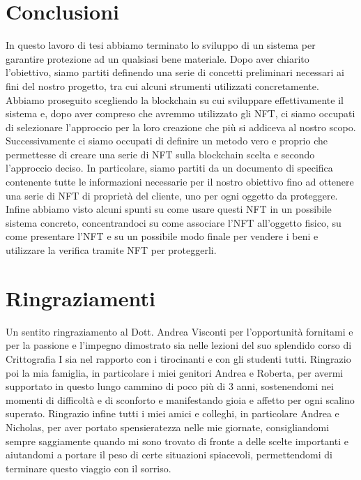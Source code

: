 \documentclass[12pt]{report}
\begin{document}
\chapter{Conclusioni}
\noindent
In questo lavoro di tesi abbiamo terminato lo sviluppo di un sistema per garantire protezione ad un qualsiasi bene materiale.\newline
Dopo aver chiarito l'obiettivo, siamo partiti definendo una serie di concetti preliminari necessari ai fini del nostro progetto, tra cui alcuni strumenti utilizzati concretamente.\newline
Abbiamo proseguito scegliendo la blockchain su cui sviluppare effettivamente il sistema e, dopo aver compreso che avremmo utilizzato gli NFT, ci siamo occupati di selezionare l'approccio per la loro creazione che più si addiceva al nostro scopo.\newline
Successivamente ci siamo occupati di definire un metodo vero e proprio che permettesse di creare una serie di NFT sulla blockchain scelta e secondo l'approccio deciso. In particolare, siamo partiti da un documento di specifica contenente tutte le informazioni necessarie per il nostro obiettivo fino ad ottenere una serie di NFT di proprietà del cliente, uno per ogni oggetto da proteggere.\newline
Infine abbiamo visto alcuni spunti su come usare questi NFT in un possibile sistema concreto, concentrandoci su come associare l'NFT all'oggetto fisico, su come presentare l'NFT e su un possibile modo finale per vendere i beni e utilizzare la verifica tramite NFT per proteggerli.

\chapter{Ringraziamenti}
\noindent
Un sentito ringraziamento al Dott. Andrea Visconti per l'opportunità fornitami e per la passione e l'impegno dimostrato sia nelle lezioni del suo splendido corso di Crittografia I sia nel rapporto con i tirocinanti e con gli studenti tutti.\newline
Ringrazio poi la mia famiglia, in particolare i miei genitori Andrea e Roberta, per avermi supportato in questo lungo cammino di poco più di 3 anni, sostenendomi nei momenti di difficoltà e di sconforto e manifestando gioia e affetto per ogni scalino superato.\newline
Ringrazio infine tutti i miei amici e colleghi, in particolare Andrea e Nicholas, per aver portato spensieratezza nelle mie giornate, consigliandomi sempre saggiamente quando mi sono trovato di fronte a delle scelte importanti e aiutandomi a portare il peso di certe situazioni spiacevoli, permettendomi di terminare questo viaggio con il sorriso.
\end{document}
